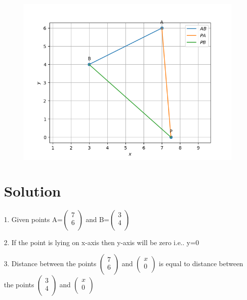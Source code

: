 \documentclass[journal,10pt,twocolumn]{article}
\begin{document}
\begin{figure}[h]
\centering
\includegraphics[width=1\columnwidth]{Figure1.png}

\label{fig}
\end{figure}

\section*{Solution}
1. Given points
A=$\begin{pmatrix}
  7 \\
  6 \\
 \end{pmatrix}$
 and B=$\begin{pmatrix}
  3 \\
  4 \\
 \end{pmatrix}$


\raggedright 2. If the point is lying on x-axis then y-axis will be zero i.e.. y=0


\raggedright 3. Distance between the points  $\begin{pmatrix}
  7 \\
  6 \\
 \end{pmatrix}$ and $\begin{pmatrix}
  x \\
  0 \\
 \end{pmatrix}$ is equal to distance between the points $\begin{pmatrix}
  3 \\
  4 \\
 \end{pmatrix}$ and $\begin{pmatrix}
  x \\
  0 \\
 \end{pmatrix}$\\ 	     
\end{document}
